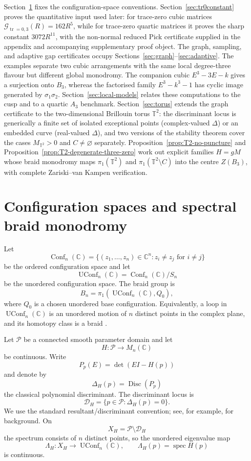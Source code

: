 \documentclass[11pt]{article}
\numberwithin{equation}{section}
\DeclareMathOperator{\Conf}{Conf}
\DeclareMathOperator{\UConf}{UConf}
\DeclareMathOperator{\Disc}{Disc}
\DeclareMathOperator{\tr}{tr}
\DeclareMathOperator{\spec}{spec}
\newcommand{\bbC}{\mathbb C}
\newcommand{\bbT}{\mathbb T}
\newcommand{\cD}{\mathcal D}
\newcommand{\cG}{\mathcal G}
\newcommand{\cP}{\mathcal P}
\begin{document}
Section~\ref{sec:config} fixes the configuration-space conventions.
Section~\ref{sec:tr0constant} proves the quantitative input used later: for
trace-zero cubic matrices \(\cG_{\tr=0,3}(R)=162R^5\), while for trace-zero
quartic matrices it proves the sharp constant \(3072R^{11}\), with the
non-normal reduced Pick certificate supplied in the appendix and accompanying
supplementary proof object.  The graph,
sampling, and adaptive gap certificates occupy
Sections~\ref{sec:graph}--\ref{sec:adaptive}.  The examples separate two
cubic arrangements with the same local degree-three flavour but different
global monodromy.  The companion cubic \(E^3-3E-k\) gives a surjection onto
\(B_3\), whereas the factorised family \(E^3-k^3-1\) has cyclic image
generated by \(\sigma_1\sigma_2\).  Section~\ref{sec:local-models} relates these computations
to the cusp and to a quartic \(A_3\) benchmark.
Section~\ref{sec:torus} extends the graph certificate to the
two-dimensional Brillouin torus \(\bbT^2\): the discriminant locus is
generically a finite set of isolated exceptional points (complex-valued
\(\Delta\)) or an embedded curve (real-valued \(\Delta\)), and two
versions of the stability theorem cover the cases \(M_{\bbT^2}>0\) and
\(C\neq\varnothing\) separately.
Proposition~\ref{prop:T2-no-puncture} and
Proposition~\ref{prop:T2-degenerate-three-zero}
work out explicit families \(H=gM\) whose braid monodromy maps
\(\pi_1(\bbT^2)\) and \(\pi_1(\bbT^2\setminus C)\) into the centre
\(Z(B_3)\), with complete Zariski--van Kampen verification.


\section{Configuration spaces and spectral braid monodromy}\label{sec:config}

Let
\[
  \Conf_n(\bbC)=\{(z_1,\ldots,z_n)\in\bbC^n:z_i\ne z_j\text{ for }i\ne j\}
\]
be the ordered configuration space and let
\[
  \UConf_n(\bbC)=\Conf_n(\bbC)/S_n
\]
be the unordered configuration space.  The braid group is
\[
  B_n=\pi_1(\UConf_n(\bbC),Q_0),
\]
where $Q_0$ is a chosen unordered base configuration.  Equivalently, a loop
in $\UConf_n(\bbC)$ is an unordered motion of $n$ distinct points in the
complex plane, and its homotopy class is a braid
\cite{Birman1975,BirmanBrendle2005}.

Let $\cP$ be a connected smooth parameter domain and let
\[
  H:\cP\longrightarrow M_n(\bbC)
\]
be continuous.  Write
\[
  P_p(E)=\det(EI-H(p))
\]
and denote by
\[
  \Delta_H(p)=\Disc(P_p)
\]
the classical polynomial discriminant.  The discriminant locus is
\[
  \cD_H=\{p\in\cP:\Delta_H(p)=0\}.
\]
We use the standard resultant/discriminant convention; see, for example,
\cite{GKZ1994} for background.
On
\[
  X_H=\cP\setminus\cD_H
\]
the spectrum consists of $n$ distinct points, so the unordered eigenvalue
map
\[
  \Lambda_H:X_H\longrightarrow \UConf_n(\bbC),
  \qquad \Lambda_H(p)=\spec H(p)
\]
is continuous.
\end{document}

